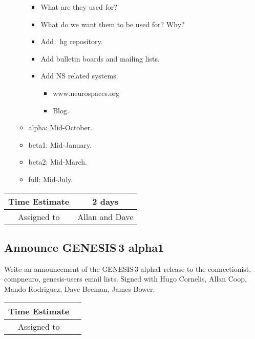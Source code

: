 \documentclass[12pt]{article}
\begin{document}
\begin{itemize}
\begin{itemize}
\begin{itemize}
    \item What are they used for?
    \item What do we want them to be used for? Why?
    \item Add {\ hg} repository.
    \item Add bulletin boards and mailing lists.
    \item Add NS related systems.
      \begin{itemize}
      \item www.neurospaces.org
      \item Blog.
      \end{itemize}
    \end{itemize}
  \item alpha: Mid-October.
  \item beta1: Mid-January.
  \item beta2: Mid-March.
  \item full: Mid-July.
  \end{itemize}
\end{itemize}

\begin{center}
  \vspace{5mm}
  \centering
  \begin{tabular}{|c|c|}
    \hline
    Time Estimate
    & 2 days \\
    \hline
    Assigned to
    & Allan and Dave \\
    \hline
  \end{tabular}
\end{center}


\subsection{Announce GENESIS\,3 alpha1}

Write an announcement of the GENESIS\,3 alpha1 release to the
connectionist,
compneuro,
genesis-users
email lists.  Signed with Hugo Cornelis, Allan Coop,
Mando Rodriguez, Dave Beeman, James Bower.

\begin{center}
  \vspace{5mm}
  \centering
  \begin{tabular}{|c|c|}
    \hline
    Time Estimate
    & \\
    \hline
    Assigned to
    & \\
    \hline
  \end{tabular}
\end{center}
\end{document}
